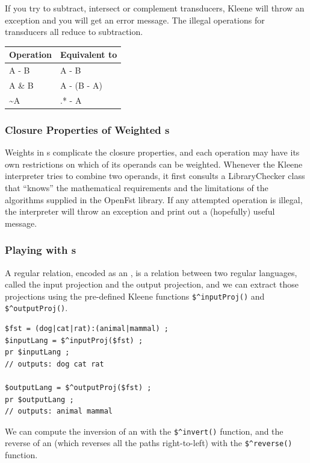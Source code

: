\vspace{4mm}

\noindent
If you try to subtract, intersect or complement transducers, Kleene will
throw an exception and you will get an error message.
The illegal operations for transducers all reduce to subtraction.

\vspace{4mm}

\begin{tabular}{|l|l|}
\hline
Operation & Equivalent to \\
\hline
A - B  &  A - B \\
A \& B  &  A - (B - A)\\
\~{}A   &  .* - A\\
\hline
\end{tabular}

\subsubsection{Closure Properties of Weighted \fsm{}s}

Weights in \fsm{}s complicate the closure properties, and each operation
may have its own restrictions on which of its operands can be weighted.
Whenever the Kleene interpreter tries to combine two \fsm{} operands, it
first consults a LibraryChecker 
class that ``knows'' the mathematical requirements and
the limitations of the algorithms supplied in the OpenFst library.  If
any attempted operation is illegal, the interpreter will throw an
exception and print out a (hopefully) useful message.

\subsubsection{Playing with \fst{}s}

A regular relation, encoded as an \fst{}, is a relation between two regular languages,
called the input projection and the output projection, and we can extract those
projections using the pre-defined Kleene functions \verb!$^inputProj()!
and \verb!$^outputProj()!.


\begin{Verbatim}
$fst = (dog|cat|rat):(animal|mammal) ;
$inputLang = $^inputProj($fst) ;
pr $inputLang ;
// outputs: dog cat rat

$outputLang = $^outputProj($fst) ;
pr $outputLang ;
// outputs: animal mammal
\end{Verbatim}

We can compute the inversion of an \fst{} with the \verb!$^invert()!
function, and the reverse of an \fsm{} (which reverses all the paths right-to-left)
with the \verb!$^reverse()! function.


